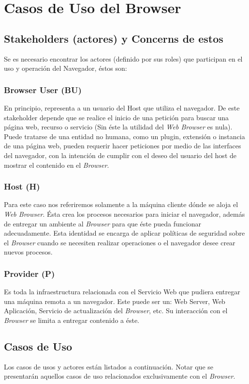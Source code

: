 \section{Casos de Uso del Browser}
	\subsection{Stakeholders (actores) y Concerns de estos}
	Se es necesario encontrar los actores (definido por sus roles) que participan en el uso y operación del Navegador, éstos son:
		\subsubsection{Browser User (BU)}
		En principio, representa a un usuario del Host que utiliza el navegador. De este stakeholder depende que se realice el inicio de una petición para buscar una página web, recurso o servicio (Sin éste la utilidad del \textit{Web Browser} es nula). Puede tratarse de una entidad no humana, como un plugin, extensión o instancia de una página web, pueden requerir hacer peticiones por medio de las interfaces del navegador, con la intención de cumplir con el deseo del usuario del host de mostrar el contenido en el \textit{Browser}.
		\subsubsection{Host (H)}
		Para este caso nos referiremos solamente a la máquina cliente dónde se aloja el \textit{Web Browser}. Ésta crea los procesos necesarios para iniciar el navegador, además de entregar un ambiente al \textit{Browser} para que éste pueda funcionar adecuadamente.  Esta identidad se encarga de aplicar políticas de seguridad sobre el \textit{Browser} cuando se necesiten realizar operaciones o el navegador desee crear nuevos procesos.
		\subsubsection{Provider (P)}
		Es toda la infraestructura relacionada con el Servicio Web que pudiera entregar una máquina remota a un navegador. Este puede ser un: Web Server, Web Aplicación, Servicio de actualización del \textit{Browser}, etc. Su interacción con el \textit{Browser} se limita a entregar contenido a éste.
		\subsection{Casos de Uso}
Los casos de usos y actores están listados a continuación. Notar que se presentarán aquellos casos de uso relacionados exclusivamente con el \textit{Browser}.

